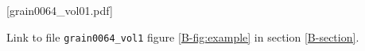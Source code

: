 \documentclass{scrbook}
\begin{document}
[grain0064_vol01.pdf]


 Link to file \texttt{grain0064\_vol1} figure \ref{B-fig:example} in section \ref{B-section}. 
\end{document}

